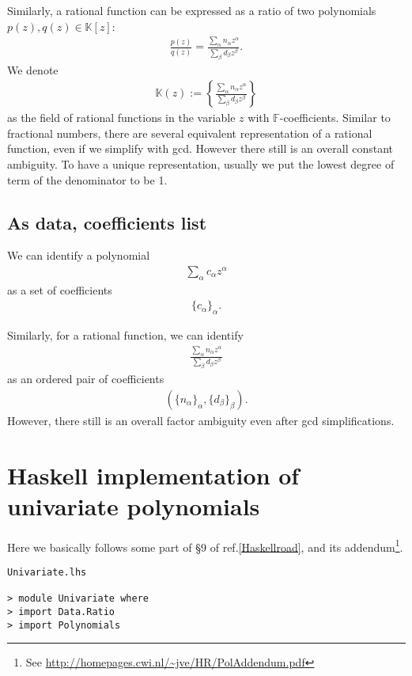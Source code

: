 \documentclass[11pt]{book}
\begin{document}
Similarly, a rational function can be expressed as a ratio of two polynomials $p(z),q(z) \in \mathbb{K}[z]$:
\begin{eqnarray}
\frac{p(z)}{q(z)} = \frac{\sum_\alpha n_\alpha z^\alpha}{\sum_\beta d_\beta z^\beta}.
\end{eqnarray}
We denote
\begin{eqnarray}
\mathbb{K}(z) := \left\{ \frac{\sum_\alpha n_\alpha z^\alpha}{\sum_\beta d_\beta z^\beta} \right\}
\end{eqnarray}
as the field of rational functions in the variable $z$ with $\mathbb{F}$-coefficients.
Similar to fractional numbers, there are several equivalent representation of a rational function, even if we simplify with gcd.
However there still is an overall constant ambiguity.
To have a unique representation, usually we put the lowest degree of term of the denominator to be 1.

\subsection{As data, coefficients list}
We can identify a polynomial
\begin{eqnarray}
\sum_\alpha c_\alpha z^\alpha
\end{eqnarray}
as a set of coefficients
\begin{eqnarray}
\{ c_\alpha\}_{\alpha}.
\end{eqnarray}

Similarly, for a rational function, we can identify
\begin{eqnarray}
\frac{\sum_\alpha n_\alpha z^\alpha}{\sum_\beta d_\beta z^\beta}
\end{eqnarray}
as an ordered pair of coefficients
\begin{eqnarray}
(\{ n_\alpha\}_\alpha, \{ d_\beta\}_\beta).
\end{eqnarray}
However, there still is an overall factor ambiguity even after gcd simplifications.

\section{Haskell implementation of univariate polynomials}
Here we basically follows some part of \S9 of ref.\ref{Haskellroad}, and its addendum\footnote{
See \url{http://homepages.cwi.nl/~jve/HR/PolAddendum.pdf}
}.

\begin{verbatim}
Univariate.lhs

> module Univariate where
> import Data.Ratio
> import Polynomials 
\end{verbatim}
\end{document}
